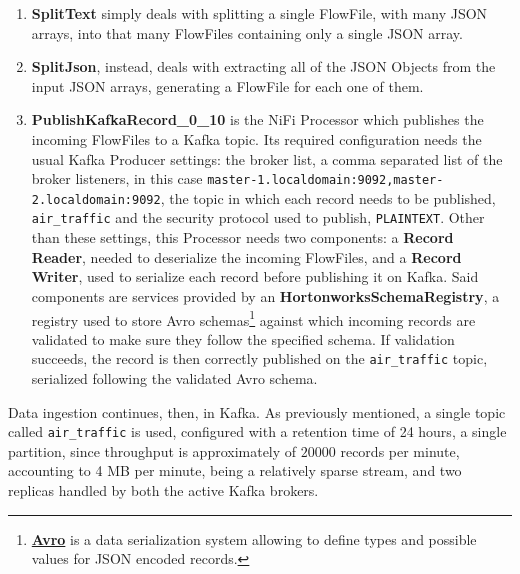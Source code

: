 \begin{enumerate}
\item \textbf{SplitText} simply deals with splitting a single FlowFile, with many JSON arrays, into that many FlowFiles containing only a single JSON array.
\item \textbf{SplitJson}, instead, deals with extracting all of the JSON Objects from the input JSON arrays, generating a FlowFile for each one of them.
\item \textbf{PublishKafkaRecord\_0\_10} is the NiFi Processor which publishes the incoming FlowFiles to a Kafka topic. Its required configuration needs the usual Kafka Producer settings: the broker list, a comma separated list of the broker listeners, in this case \texttt{master-1.localdomain:9092,master-2.localdomain:9092}, the topic in which each record needs to be published, \texttt{air\_traffic} and the security protocol used to publish, \texttt{PLAINTEXT}. Other than these settings, this Processor needs two components: a \textbf{Record Reader}, needed to deserialize the incoming FlowFiles, and a \textbf{Record Writer}, used to serialize each record before publishing it on Kafka. Said components are services provided by an \textbf{HortonworksSchemaRegistry}, a registry used to store Avro schemas\footnote{\textbf{\href{https://avro.apache.org/}{Avro}} is a data serialization system allowing to define types and possible values for JSON encoded records.} against which incoming records are validated to make sure they follow the specified schema. If validation succeeds, the record is then correctly published on the \texttt{air\_traffic} topic, serialized following the validated Avro schema.
\end{enumerate}

Data ingestion continues, then, in Kafka. As previously mentioned, a single topic called \texttt{air\_traffic} is used, configured with a retention time of 24 hours, a single partition, since throughput is approximately of $20000$ records per minute, accounting to 4 MB per minute, being a relatively sparse stream, and two replicas handled by both the active Kafka brokers.
\pagebreak
